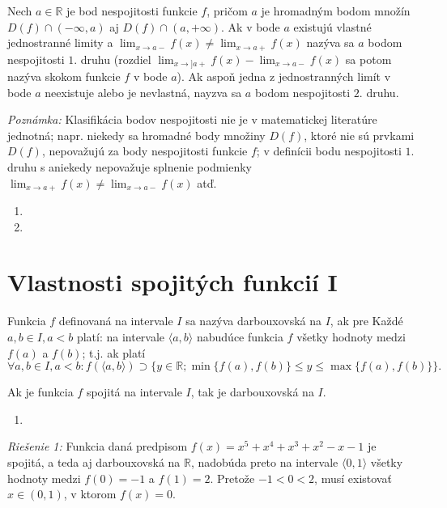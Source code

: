 Nech $a \in \mathbb{R}$ je bod nespojitosti funkcie $f$, pričom $a$ je hromadným bodom množín $D(f) \cap (-\infty,a)$ aj $D(f)\cap (a,+\infty)$. Ak v bode $a$ existujú vlastné jednostranné limity a $\lim_{x \rightarrow a-}f(x) \neq \lim_{x \rightarrow a+}f(x)$ nazýva sa $a$ bodom nespojitosti $1.$ druhu (rozdiel $\lim_{x \rightarrow] a+}f(x)-\lim_{x \rightarrow a-}f(x)$ sa potom nazýva skokom funkcie $f$ v bode $a$). Ak aspoň jedna z jednostranných limít v bode $a$ neexistuje alebo je nevlastná, nayzva sa $a$ bodom nespojitosti $2.$ druhu.

\textit{Poznámka:}
Klasifikácia bodov nespojitosti nie je v matematickej literatúre jednotná; napr. niekedy sa hromadné body množiny $D(f)$, ktoré nie sú prvkami $D(f)$, nepovažujú za body nespojitosti funkcie $f$; v definícii bodu nespojitosti $1.$ druhu s aniekedy nepovažuje splnenie podmienky $\lim_{x \rightarrow a+}f(x) \neq \lim_{x \rightarrow a-}f(x)$ atď.

\begin{enumerate}[resume]
	\item {}
	\item {}
\end{enumerate}

\section{Vlastnosti spojitých funkcií I}

Funkcia $f$ definovaná na intervale $I$ sa nazýva darbouxovská na $I$, ak pre Každé $a,b \in I,a<b$ platí: na intervale $\langle a,b \rangle$ nabudúce funkcia $f$ všetky hodnoty medzi $f(a)$ a $f(b)$; t.j. ak platí 
$$\forall a,b \in I,a<b:f(\langle a,b \rangle)\supset \{y \in \mathbb{R}; \min \{f(a),f(b)\} \leq y \leq \max \{f(a),f(b)\}\}.$$

\begin{veta}
Ak je funkcia $f$ spojitá na intervale $I$, tak je darbouxovská na $I$.
\end{veta}

\begin{enumerate}[resume]
	\item {}
\end{enumerate}

\textit{Riešenie 1:}
Funkcia daná predpisom $f(x)=x^5+x^4+x^3+x^2-x-1$ je spojitá, a teda aj darbouxovská na $\mathbb{R}$, nadobúda preto na intervale $\langle 0,1 \rangle$ všetky hodnoty medzi $f(0)=-1$ a $f(1)=2$. Pretože $-1<0<2$, musí existovať $x \in (0,1)$, v ktorom $f(x)=0$.

